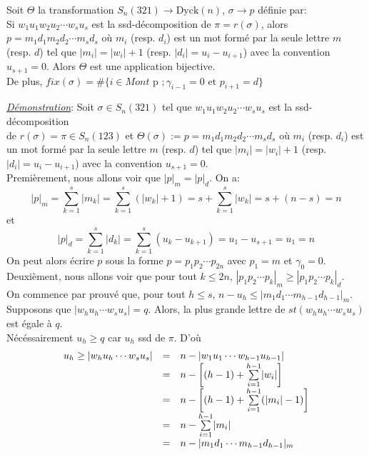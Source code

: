 \begin{proposition} \label{dyck_to_avoiding_321_tfsm}
	Soit $\Theta$ la transformation $S_{n}(321)\longrightarrow \text{Dyck}(n)$, $\sigma \longrightarrow p$ définie par:\\
	Si $w_{1}u_{1}w_{2}u_2 \cdots w_{s}u_{s}$ est la ssd-décomposition de $\pi=r(\sigma)$, alors $p=m_{1}d_{1}m_{2}d_{2}\cdots m_{s}d_{s}$ où $m_{i}$ (resp. $d_{i}$) est un mot formé par la seule lettre $m$ (resp. $d$) tel que $|m_{i}| = |w_{i}|+1$ (resp. $|d_{i}| = u_{i}-u_{i+1}$) avec la convention $u_{s+1}=0$. Alors $\Theta$ est une application bijective.\\
	De plus, $fix(\sigma)= \#\{i \in Mont\text{ p }; \gamma_{i-1}=0 \text{ et } p_{i+1}=d\}$
\end{proposition}

\underline{\textit{Démonstration}}:
Soit $\sigma\in S_{n}(321)$ tel que $w_{1}u_{1}w_{2}u_2 \cdots w_{s}u_{s}$ est la ssd-décomposition \\ de $r(\sigma)=\pi \in S_{n}(123)$  et $\Theta(\sigma):=p=m_{1}d_{1}m_{2}d_{2}\cdots m_{s}d_{s}$ où  $m_{i}$ (resp. $d_{i}$) est un mot formé par la seule lettre $m$ (resp. $d$) tel que $|m_{i}| = |w_{i}|+1$ (resp. $|d_{i}| = u_{i}-u_{i+1}$) avec la convention $u_{s+1}=0$.\vspace{10pt}\\
Premièrement, nous allons voir que $|p|_{m} = |p|_{d}$. On a:
$$
	|p|_{m} = \underset{k=1}{\overset{s}{\sum}}|m_{k}| = \underset{k=1}{\overset{s}{\sum}}(|w_{k}|+1)=s+\underset{k=1}{\overset{s}{\sum}}|w_{k}| = s+(n-s)=n
$$
et
$$
	|p|_{d} = \underset{k=1}{\overset{s}{\sum}}|d_{k}| = \underset{k=1}{\overset{s}{\sum}}(u_{k}-u_{k+1}) = u_{1} - u_{s+1}=u_{1}=n
$$
On peut alors écrire $p$ sous la forme $p=p_{1}p_{2}\cdots p_{2n}$ avec $p_{1}=m$ et  $\gamma_{0}=0$.\vspace{10pt}\\
Deuxièment, nous allons voir que pour tout $k\leq 2n$, $|p_{1}p_{2}\cdots p_{k}|_{m}\geq |p_{1}p_{2}\cdots p_{k}|_{d}$.\\
On commence par prouvé que, pour tout $h\leq s$, $n-u_{h}\leq |m_{1}d_{1}\cdots m_{h-1}d_{h-1} |_{m}$.\\
Supposons que $| w_{h}u_{h}\cdots w_{s}u_{s} |=q$. Alors, la plus grande lettre de $st(w_{h}u_{h}\cdots w_{s}u_{s})$  est égale à $q$.\\ Nécéssairement $u_{h}\geq q$ car $u_{h}$ ssd de $\pi$. D'où
\[\begin{array}{l l l}
		u_{h}\geq | w_{h}u_{h}\cdots w_{s}u_{s} | & = & n-| w_{1}u_{1}\cdots w_{h-1}u_{h-1} |                                 \\
		                                          & = & n-\left[ (h-1)+ \underset{i=1}{\overset{h-1}{\sum}}|w_{i}|\right]     \\
		                                          & = & n-\left[ (h-1)+ \underset{i=1}{\overset{h-1}{\sum}}(|m_{i}|-1)\right] \\
		                                          & = & n- \underset{i=1}{\overset{h-1}{\sum}}|m_{i}|                         \\
		                                          & = & n - | m_{1}d_{1}\cdots m_{h-1}d_{h-1} |_{m}
	\end{array}
\]
